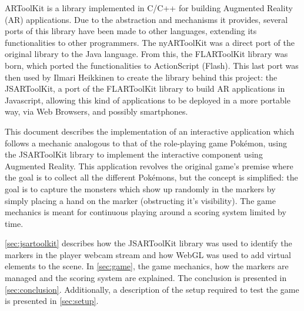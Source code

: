 \label{sec:intro}

ARToolKit is a library implemented in C/C++ for building Augmented Reality (AR) applications. Due to the abstraction and mechanisms it provides, several ports of this library have been made to other languages, extending its functionalities to other programmers. The nyARToolKit was a direct port of the original library to the Java language. From this, the FLARToolKit library was born, which ported the functionalities to ActionScript (Flash). This last port was then used by Ilmari Heikkinen to create the library behind this project: the JSARToolKit, a port of the FLARToolKit library to build AR applications in Javascript, allowing this kind of applications to be deployed in a more portable way, via Web Browsers, and possibly smartphones.

This document describes the implementation of an interactive application which follows a mechanic analogous to that of the role-playing game Pokémon\textsuperscript{\textregistered}, using the JSARToolKit library to implement the interactive component using Augmented Reality. This application revolves the original game's premise where the goal is to collect all the different Pokémons, but the concept is simplified: the goal is to capture the monsters which show up randomly in the markers by simply placing a hand on the marker (obstructing it's visibility). The game mechanics is meant for continuous playing around a scoring system limited by time.

\cref{sec:jsartoolkit} describes how the JSARToolKit library was used to identify the markers in the player webcam stream and how WebGL was used to add virtual elements to the scene. In \cref{sec:game}, the game mechanics, how the markers are managed and the scoring system are explained. The conclusion is presented in \cref{sec:conclusion}. Additionally, a description of the setup required to test the game is presented in \cref{sec:setup}.
